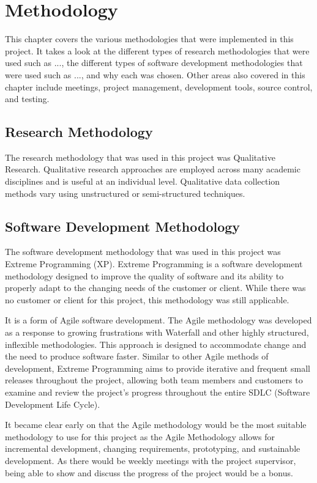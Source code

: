 \chapter{Methodology}
This chapter covers the various methodologies that were implemented in this project. It takes a look at the different types of research methodologies that were used such as ..., the different types of software development methodologies that were used such as ..., and why each was chosen. Other areas also covered in this chapter include meetings, project management, development tools, source control, and testing.

\section{Research Methodology}
The research methodology that was used in this project was Qualitative Research. Qualitative research approaches are employed across many academic disciplines and is useful at an individual level. Qualitative data collection methods vary using unstructured or semi-structured techniques.

\section{Software Development Methodology}
The software development methodology that was used in this project was Extreme Programming (XP). Extreme Programming is a software development methodology designed to improve the quality of software and its ability to properly adapt to the changing needs of the customer or client. While there was no customer or client for this project, this methodology was still applicable. 
\par
\medskip
It is a form of Agile software development. The Agile methodology was developed as a response to growing frustrations with Waterfall and other highly structured, inflexible methodologies. This approach is designed to accommodate change and the need to produce software faster. Similar to other Agile methods of development, Extreme Programming aims to provide iterative and frequent small releases throughout the project, allowing both team members and customers to examine and review the project’s progress throughout the entire SDLC (Software Development Life Cycle). 
\par
\medskip
It became clear early on that the Agile methodology would be the most suitable methodology to use for this project as the Agile Methodology allows for incremental development, changing requirements, prototyping, and sustainable development. As there would be weekly meetings with the project supervisor, being able to show and discuss the progress of the project would be a bonus. 

